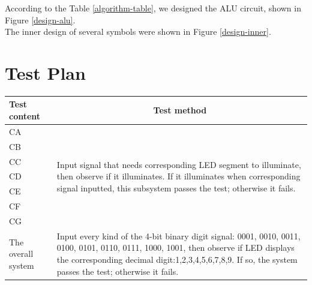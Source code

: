 \documentclass{article}
\begin{document}
According to the Table \ref{algorithm-table}, we designed the ALU circuit, shown in Figure \ref{design-alu}. \\


The inner design of several symbols were shown in Figure \ref{design-inner}. \\


\newpage

\section{Test Plan}
\begin{center}
\begin{tabular}{|m{3cm}<{\centering}|m{10cm}|}
\hline
Test content & \multicolumn{1}{c|}{Test method} \\\hline
CA & \multirow{7}{10cm}{Input signal that needs corresponding LED segment to illuminate, then observe if it illuminates. If it illuminates when corresponding signal inputted, this subsystem passes the test; otherwise it fails.} \\\cline{1-1}
CB & \\\cline{1-1}
CC & \\\cline{1-1}
CD & \\\cline{1-1}
CE & \\\cline{1-1}
CF & \\\cline{1-1}
CG & \\\hline
The overall system & Input every kind of the 4-bit binary digit signal: 0001, 0010, 0011, 0100, 0101, 0110, 0111, 1000, 1001, then observe if LED displays the corresponding decimal digit:1,2,3,4,5,6,7,8,9. If so, the system passes the test; otherwise it fails. \\\hline
\end{tabular}
\end{center}
\end{document}

